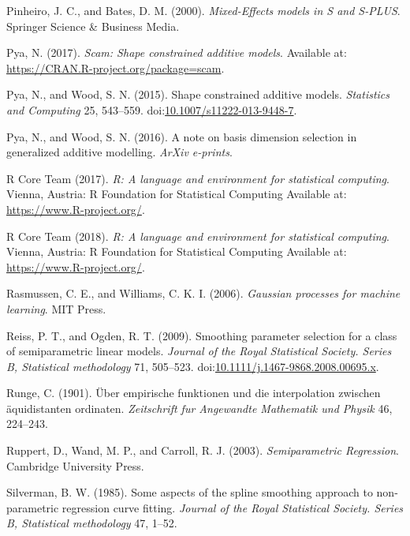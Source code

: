 \documentclass[12pt,]{article}
\begin{document}
\hypertarget{ref-Pinheiro2000-kx}{}
Pinheiro, J. C., and Bates, D. M. (2000). \emph{Mixed-Effects models in
S and S-PLUS}. Springer Science \& Business Media.

\hypertarget{ref-pya-scam-pkg}{}
Pya, N. (2017). \emph{Scam: Shape constrained additive models}.
Available at: \url{https://CRAN.R-project.org/package=scam}.

\hypertarget{ref-Pya2015-wr}{}
Pya, N., and Wood, S. N. (2015). Shape constrained additive models.
\emph{Statistics and Computing} 25, 543--559.
doi:\href{https://doi.org/10.1007/s11222-013-9448-7}{10.1007/s11222-013-9448-7}.

\hypertarget{ref-Pya2016-rk}{}
Pya, N., and Wood, S. N. (2016). A note on basis dimension selection in
generalized additive modelling. \emph{ArXiv e-prints}.

\hypertarget{ref-R-core-team}{}
R Core Team (2017). \emph{R: A language and environment for statistical
computing}. Vienna, Austria: R Foundation for Statistical Computing
Available at: \url{https://www.R-project.org/}.

\hypertarget{ref-Rcore}{}
R Core Team (2018). \emph{R: A language and environment for statistical
computing}. Vienna, Austria: R Foundation for Statistical Computing
Available at: \url{https://www.R-project.org/}.

\hypertarget{ref-Rasmussen2006-xk}{}
Rasmussen, C. E., and Williams, C. K. I. (2006). \emph{Gaussian
processes for machine learning}. MIT Press.

\hypertarget{ref-Reiss2009-fk}{}
Reiss, P. T., and Ogden, R. T. (2009). Smoothing parameter selection for
a class of semiparametric linear models. \emph{Journal of the Royal
Statistical Society. Series B, Statistical methodology} 71, 505--523.
doi:\href{https://doi.org/10.1111/j.1467-9868.2008.00695.x}{10.1111/j.1467-9868.2008.00695.x}.

\hypertarget{ref-Runge1901-tc}{}
Runge, C. (1901). Über empirische funktionen und die interpolation
zwischen äquidistanten ordinaten. \emph{Zeitschrift fur Angewandte
Mathematik und Physik} 46, 224--243.

\hypertarget{ref-Ruppert2003-pt}{}
Ruppert, D., Wand, M. P., and Carroll, R. J. (2003).
\emph{Semiparametric Regression}. Cambridge University Press.

\hypertarget{ref-Silverman1985-kw}{}
Silverman, B. W. (1985). Some aspects of the spline smoothing approach
to non-parametric regression curve fitting. \emph{Journal of the Royal
Statistical Society. Series B, Statistical methodology} 47, 1--52.
\end{document}
